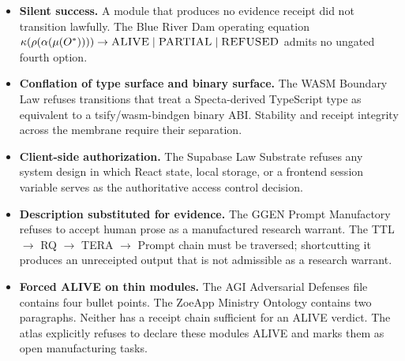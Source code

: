 \begin{itemize}
  \item \textbf{Silent success.} A module that produces no evidence receipt did
        not transition lawfully. The Blue River Dam operating equation
        $\kappa(\rho(\alpha(\mu(O^*)))) \to \textsc{ALIVE} \mid \textsc{PARTIAL}
        \mid \textsc{REFUSED}$ admits no ungated fourth option.

  \item \textbf{Conflation of type surface and binary surface.} The WASM
        Boundary Law refuses transitions that treat a Specta-derived TypeScript
        type as equivalent to a tsify/wasm-bindgen binary ABI. Stability and
        receipt integrity across the membrane require their separation.

  \item \textbf{Client-side authorization.} The Supabase Law Substrate refuses
        any system design in which React state, local storage, or a frontend
        session variable serves as the authoritative access control decision.

  \item \textbf{Description substituted for evidence.} The GGEN Prompt
        Manufactory refuses to accept human prose as a manufactured research
        warrant. The TTL $\to$ RQ $\to$ TERA $\to$ Prompt chain must be
        traversed; shortcutting it produces an unreceipted output that is not
        admissible as a research warrant.

  \item \textbf{Forced ALIVE on thin modules.} The AGI Adversarial Defenses
        file contains four bullet points. The ZoeApp Ministry Ontology contains
        two paragraphs. Neither has a receipt chain sufficient for an ALIVE
        verdict. The atlas explicitly refuses to declare these modules ALIVE and
        marks them as open manufacturing tasks.
\end{itemize}

